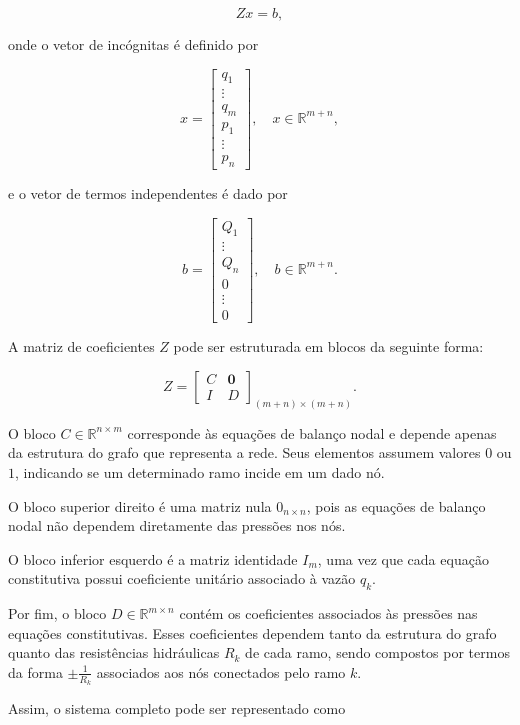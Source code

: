 \documentclass{article}
\begin{document}
\[
Zx = b,
\]

onde o vetor de incógnitas é definido por

\[
x =
\begin{bmatrix}
q_1 \\
\vdots \\
q_m \\
p_1 \\
\vdots \\
p_n
\end{bmatrix},
\quad
x \in \mathbb{R}^{m+n},
\]

e o vetor de termos independentes é dado por

\[
b =
\begin{bmatrix}
Q_1 \\
\vdots \\
Q_n \\
0 \\
\vdots \\
0
\end{bmatrix},
\quad
b \in \mathbb{R}^{m+n}.
\]

A matriz de coeficientes \(Z\) pode ser estruturada em blocos da seguinte forma:

\[
Z =
\begin{bmatrix}
C & \textbf{0} \\
I & D
\end{bmatrix}_ {(m+n)\times (m+n)}.
\]


O bloco \(C \in \mathbb{R}^{n \times m}\) corresponde às equações de balanço nodal e depende apenas da estrutura do grafo que representa a rede. Seus elementos assumem valores \(0\) ou \(1\), indicando se um determinado ramo incide em um dado nó.

O bloco superior direito é uma matriz nula \(0_{n \times n}\), pois as equações de balanço nodal não dependem diretamente das pressões nos nós.

O bloco inferior esquerdo é a matriz identidade \(I_m\), uma vez que cada equação constitutiva possui coeficiente unitário associado à vazão \(q_k\).

Por fim, o bloco \(D \in \mathbb{R}^{m \times n}\) contém os coeficientes associados às pressões nas equações constitutivas. Esses coeficientes dependem tanto da estrutura do grafo quanto das resistências hidráulicas \(R_k\) de cada ramo, sendo compostos por termos da forma \(\pm \frac{1}{R_k}\) associados aos nós conectados pelo ramo \(k\).

Assim, o sistema completo pode ser representado como
\end{document}
